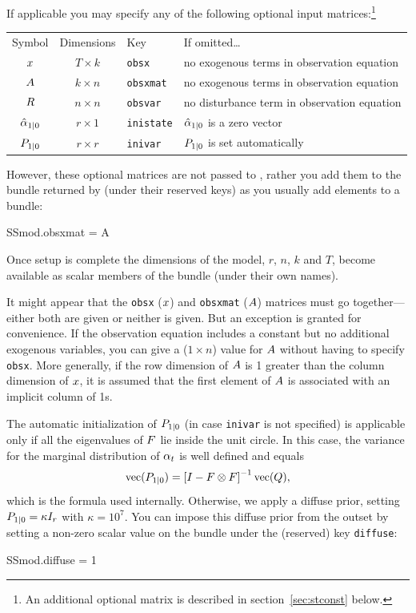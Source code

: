 \documentclass[a4paper]{article}
\begin{document}
If applicable you may specify any of the following optional input
matrices:\footnote{An additional optional matrix is described in
section~\ref{sec:stconst} below.}

\begin{center}
\begin{tabular}{ccll}
Symbol & Dimensions & Key & If omitted\dots \\[6pt]
$x$ & $T \times k$ & \texttt{obsx} &
 no exogenous terms in observation equation\\
$A$ & $k \times n$ & \texttt{obsxmat} &
 no exogenous terms in observation equation\\ 
$R$ & $n \times n$ & \texttt{obsvar} & 
 no disturbance term in observation equation \\
$\hat{\alpha}_{1|0}$ & $r \times 1$ & \texttt{inistate} &
 $\hat{\alpha}_{1|0}$ is a zero vector\\
$P_{1|0}$ & $r \times r$ & \texttt{inivar} &
 $P_{1|0}$ is set automatically
\end{tabular}
\end{center}

However, these optional matrices are not passed to ,
rather you add them to the bundle returned by  (under
their reserved keys) as you usually add elements to a bundle:
\begin{code}
SSmod.obsxmat = A
\end{code}

Once setup is complete the dimensions of the model, $r$, $n$, $k$ and
$T$, become available as scalar members of the bundle (under their own
names).

It might appear that the \texttt{obsx} ($x$) and \texttt{obsxmat}
($A$) matrices must go together---either both are given or
neither is given.  But an exception is granted for convenience.  If
the observation equation includes a constant but no additional
exogenous variables, you can give a ($1 \times n$) value for
$A$ without having to specify \texttt{obsx}.  More generally,
if the row dimension of $A$ is 1 greater than the column
dimension of $x$, it is assumed that the first element of
$A$ is associated with an implicit column of 1s.

The automatic initialization of $P_{1|0}$ (in case
\texttt{inivar} is not specified) is applicable only if all the
eigenvalues of $F$ lie inside the unit circle. In this case,
the variance for the marginal distribution of $\alpha_t$ is well
defined and equals
\[
\mbox{vec}(P_{1|0}) = \left[ I - F \otimes F
\right]^{-1} \mbox{vec}(Q) ,
\]
which is the formula used internally. Otherwise, we apply a diffuse
prior, setting $P_{1|0} = \kappa I_r$ with $\kappa = 10^7$.
You can impose this diffuse prior from the outset by setting a
non-zero scalar value on the bundle under the (reserved) key
\texttt{diffuse}:
%
\begin{code}
SSmod.diffuse = 1
\end{code}
\end{document}
